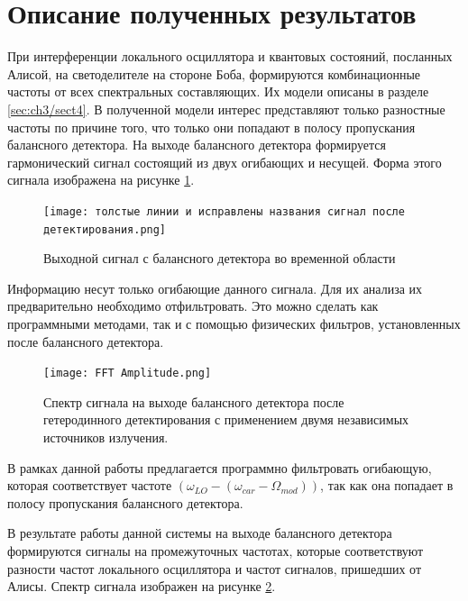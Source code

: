 \section{Описание полученных результатов}\label{sec:ch3/sect7}
При интерференции локального осциллятора и квантовых состояний, посланных Алисой, на светоделителе на стороне Боба, формируются комбинационные частоты от всех спектральных составляющих. Их модели описаны в разделе \ref*{sec:ch3/sect4}.
В полученной модели интерес представляют только разностные частоты по причине того, что только они попадают в полосу пропускания балансного детектора.
На выходе балансного детектора формируется гармонический сигнал состоящий из двух огибающих и несущей. Форма этого сигнала изображена на рисунке \ref*{fig: het true time}. 
\begin{figure}
    \centering
    \texttt{[image: толстые линии и исправлены названия сигнал после детектирования.png]}
    \caption{Выходной сигнал с балансного детектора во временной области}
    \label{fig: het true time}
\end{figure}
Информацию несут только огибающие данного сигнала. Для их анализа их предварительно необходимо отфильтровать. Это можно сделать как программными методами, так и с помощью физических фильтров, установленных после балансного детектора.
\begin{figure}
    \centering
    \texttt{[image: FFT Amplitude.png]}
    \caption{Спектр сигнала на выходе балансного детектора после гетеродинного детектирования с применением двумя независимых источников излучения.}
    \label{fig: het true spec}
\end{figure}
В рамках данной работы предлагается программно фильтровать огибающую, которая соответствует частоте $(\omega_{LO} -(\omega_{car} - \Omega_{mod}))$, так как она попадает в полосу пропускания балансного детектора. 

В результате работы данной системы на выходе балансного детектора формируются сигналы на промежуточных частотах, которые соответствуют разности частот локального осциллятора и частот сигналов, пришедших от Алисы. Спектр сигнала изображен на рисунке \ref{fig: het true spec}.

